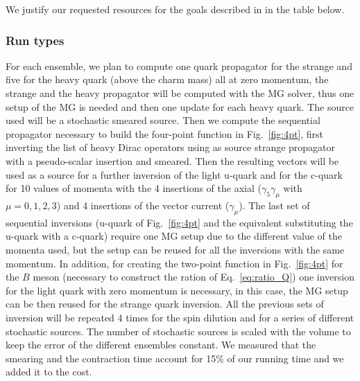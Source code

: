 

We justify our requested resources for the goals described
in  in the table below.

\subsubsection{Run types \label{sec:runtypes}}


For each ensemble, we plan to compute  one quark propagator for the strange
and five for the heavy quark (above the charm mass) all at zero momentum, the strange and the heavy propagator 
will be computed with the MG solver, thus one setup of the MG is needed and then one update for each 
heavy quark. 
The source used will be a stochastic smeared source.
Then we compute the sequential propagator necessary to build the four-point function in Fig.~\ref{fig:4pt},
first inverting the list of heavy Dirac operators using as source strange propagator with a pseudo-scalar
insertion and smeared. Then the resulting vectors will be used as a source for a further inversion of the light u-quark and for the c-quark for 10 values of momenta with the 4 insertions of the axial ($\gamma_5\gamma_\mu$ with $\mu=0,1,2,3$) and 4 insertions of the vector current ($\gamma_\mu$). The last set of sequential inversions (u-quark of Fig.~\ref{fig:4pt} and the equivalent substituting the u-quark with a c-quark) require one MG setup due to the different value of the momenta used, but the setup can be reused for all the inversions with the same momentum.
In addition, for creating the two-point function in Fig.~\ref{fig:4pt} for the $B$ meson (necessary to construct the ration of Eq.~\ref{eq:ratio_Q}) one
inversion for the light quark with zero momentum is necessary, in this case, the MG setup can be then reused for the strange quark inversion.
All the previous sets of inversion will be repeated 4 times for the spin dilution and for a series of different stochastic sources.
The number of stochastic sources is scaled with the volume to keep the error of the different ensembles constant. We measured that the smearing and the contraction time account for 15\% of our running time and we added it to the cost.

